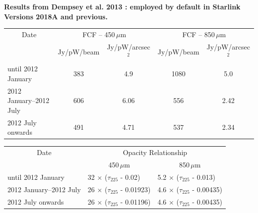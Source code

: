 \textbf{Results from Dempsey et al. 2013 \cite{dempsey12}: employed by
default in Starlink Versions 2018A and previous.}\\
\begin{table}[h!]
\begin{center}
\begin{tabular}{|l|c|c|c|c|}
 \hline
 \multicolumn{1}{|c|}{Date} &
 \multicolumn{2}{c|}{FCF -- 450\,$\mu$m} &
 \multicolumn{2}{c|}{FCF -- 850\,$\mu$m} \\
\cline{2-5}
& Jy/pW/beam &Jy/pW/arcsec$^2$ & Jy/pW/beam &Jy/pW/arcsec$^2$ \\
 \hline
until 2012 January       & 383 & 4.9\hphantom{0} & 1080            & 5.0\hphantom{0} \\
2012 January--2012 July  & 606 & 6.06            & \hphantom{1}556 & 2.42 \\
2012 July onwards        & 491 & 4.71            & \hphantom{1}537 & 2.34 \\
\hline
\end{tabular}
\end{center}
\end{table}
\vspace{-2mm}
\begin{table}[h!]
\begin{center}
\begin{tabular}{|l|l|l|}
 \hline
 \multicolumn{1}{|c}{Date} & \multicolumn{2}{|c|}{Opacity Relationship}  \\ \cline{2-3}
                           & \multicolumn{1}{|c|}{450\,$\mu$m}    & \multicolumn{1}{|c|}{850\,$\mu$m} \\ \hline
until 2012 January         & 32 $\times$ ($\tau_{225}$ - 0.02)    & 5.2 $\times$ ($\tau_{225}$ - 0.013)  \\
2012 January--2012 July    & 26 $\times$ ($\tau_{225}$ - 0.01923) & 4.6 $\times$ ($\tau_{225}$ - 0.00435) \\
2012 July onwards          & 26 $\times$ ($\tau_{225}$ - 0.01196) & 4.6 $\times$ ($\tau_{225}$ - 0.00435) \\
\hline
\end{tabular}
\end{center}
\end{table}
